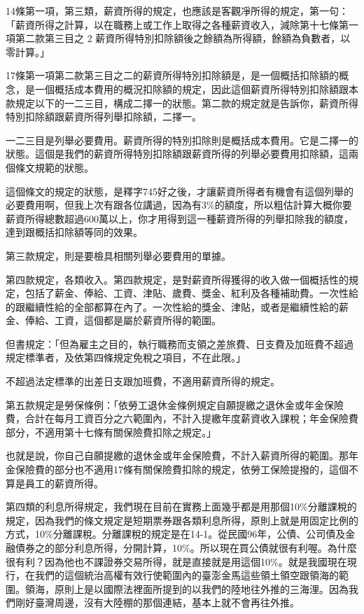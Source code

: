 \documentclass[oneside,sub3section]{ctexbook}
\begin{document}
14條第一項，第三類，薪資所得的規定，也應該是客觀凈所得的規定，第一句：「薪資所得之計算，以在職務上或工作上取得之各種薪資收入，減除第十七條第一項第二款第三目之 2 薪資所得特別扣除額後之餘額為所得額，餘額為負數者，以零計算。」

17條第一項第二款第三目之二的薪資所得特別扣除額是，是一個概括扣除額的概念，是一個概括成本費用的概況扣除額的規定，因此這個薪資所得特別扣除額跟本款規定以下的一二三目，構成二擇一的狀態。第二款的規定就是告訴你，薪資所得特別扣除額跟薪資所得列舉扣除額，二擇一。

一二三目是列舉必要費用。薪資所得的特別扣除則是概括成本費用。它是二擇一的狀態。這個是我們的薪資所得特別扣除額跟薪資所得的列舉必要費用扣除額，這兩個條文規範的狀態。

這個條文的規定的狀態，是釋字745好之後，才讓薪資所得者有機會有這個列舉的必要費用啊，但我上次有跟各位講過，因為有3\%的額度，所以粗估計算大概你要薪資所得總數超過600萬以上，你才用得到這一種薪資所得的列舉扣除我的額度，達到跟概括扣除額等同的效果。

第三款規定，則是要檢具相關列舉必要費用的單據。

第四款規定，各類收入。第四款規定，是對薪資所得獲得的收入做一個概括性的規定，包括了薪金、俸給、工資、津貼、歲費、獎金、紅利及各種補助費。一次性給的跟繼續性給的全部都算在內了。一次性給的獎金、津貼，或者是繼續性給的薪金、俸給、工資，這個都是屬於薪資所得的範圍。

但書規定：「但為雇主之目的，執行職務而支領之差旅費、日支費及加班費不超過規定標準者，及依第四條規定免稅之項目，不在此限。」

不超過法定標準的出差日支跟加班費，不適用薪資所得的規定。

第五款規定是勞保條例：「依勞工退休金條例規定自願提繳之退休金或年金保險費，合計在每月工資百分之六範圍內，不計入提繳年度薪資收入課稅；年金保險費部分，不適用第十七條有關保險費扣除之規定。」

也就是說，你自己自願提繳的退休金或年金保險費，不計入薪資所得的範圍。那年金保險費的部分也不適用17條有關保險費扣除的規定，依勞工保險提撥的，這個不算是員工的薪資所得。

第四類的利息所得規定，我們現在目前在實務上面幾乎都是用那個10\%分離課稅的規定，因為我們的條文規定是短期票券跟各類利息所得，原則上就是用固定比例的方式，10\%分離課稅。分離課稅的規定是在14-1。從民國96年，公債、公司債及金融債券之的部分利息所得，分開計算，10\%。所以現在買公債就很有利喔。為什麼很有利？因為他也不課證券交易所得，就是直接就是用這個10\%。就是我國現在現行，在我們的這個統治高權有效行使範圍內的臺澎金馬這些領土領空跟領海的範圍。領海，原則上是以國際法裡面所提到的以我們的陸地往外推的三海浬。因為我們剛好臺灣周邊，沒有大陸棚的那個連結，基本上就不會再往外推。
\end{document}
